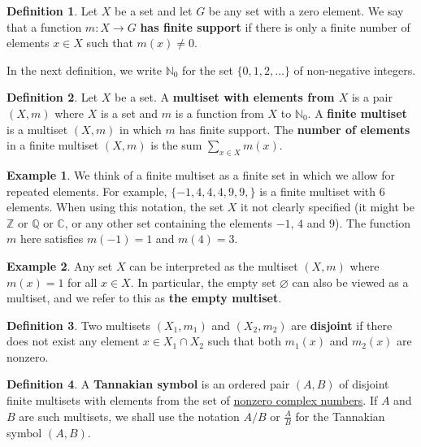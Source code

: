 \documentclass[a4paper]{article}
\theoremstyle{definition}
\newtheorem{definition}{Definition}[section]
\newtheorem{example}{Example}[section]
\theoremstyle{remark}
\newcommand{\N}{\mathbb{N}}
\newcommand{\Z}{\mathbb{Z}}
\newcommand{\Q}{\mathbb{Q}}
\newcommand{\C}{\mathbb{C}}
\newcommand{\defhl}[1]{\textbf{#1}}
\begin{document}
\begin{definition}
Let $X$ be a set and let $G$ be any set with a zero element. We say that a function $m: X \to G$ \defhl{has finite support} if there is only a finite number of elements $x \in X$ such that $m(x) \neq 0$. 
\end{definition}

In the next definition, we write $\N_0$ for the set $\{  0, 1, 2, \ldots  \}$ of non-negative integers.

\begin{definition}
Let $X$ be a set. A \defhl{multiset with elements from $X$} is a pair $(X, m)$ where $X$ is a set and $m$ is a function from $X$ to $\N_0$. A \defhl{finite multiset} is a multiset $(X, m)$ in which $m$ has finite support. The \defhl{number of elements} in a finite multiset $(X, m)$ is the sum $\sum_{x \in X} m(x)$.
\end{definition}

\begin{example}
We think of a finite multiset as a finite set in which we allow for repeated elements. For example, $\{ -1, 4, 4, 4, 9, 9,   \}$ is a finite multiset with 6 elements. When using this notation, the set $X$ it not clearly specified (it might be $\Z$ or $\Q$ or $\C$, or any other set containing the elements $-1$, $4$ and $9$). The function $m$ here satisfies $m(-1) = 1$ and $m(4) = 3$.
\end{example}

\begin{example}
Any set $X$ can be interpreted as the multiset $(X, m)$ where $m(x) = 1$ for all $x \in X$. In particular, the empty set $\varnothing$ can also be viewed as a multiset, and we refer to this as \defhl{the empty multiset}.
\end{example}

\begin{definition}
Two multisets $(X_1, m_1)$ and $(X_2, m_2)$ are \defhl{disjoint} if there does not exist any element $x \in X_1 \cap X_2$ such that both $m_1(x)$ and $m_2(x)$ are nonzero.
\end{definition}

\begin{definition}
A \defhl{Tannakian symbol} is an ordered pair $(A, B)$ of disjoint finite multisets with elements from the set of \underline{nonzero complex numbers}. If $A$ and $B$ are such multisets, we shall use the notation $A/B$ or $\frac{A}{B}$ for the Tannakian symbol $(A, B)$.
\end{definition}
\end{document}

